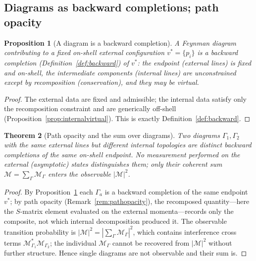\documentclass[11pt,a4paper]{article}
\theoremstyle{thmstyle}
\newtheorem{theorem}{Theorem}[section]
\newtheorem{proposition}[theorem]{Proposition}
\theoremstyle{definition}
\theoremstyle{remark}
\newcommand{\Mmat}{\mathcal{M}}
\begin{document}
\subsection{Diagrams as backward completions; path opacity}
\label{sec:diagramsbackward}

\begin{proposition}[A diagram is a backward completion]
\label{prop:diagrambackward}
A Feynman diagram contributing to a fixed on-shell external configuration
$v^{\ast}=\{p_i\}$ is a backward completion (Definition~\ref{def:backward})
of $v^{\ast}$: the endpoint (external lines) is fixed and on-shell, the
intermediate components (internal lines) are unconstrained except by
recomposition (conservation), and they may be virtual.
\end{proposition}

\begin{proof}
The external data are fixed and admissible; the internal data satisfy only
the recomposition constraint and are generically off-shell
(Proposition~\ref{prop:internalvirtual}). This is exactly
Definition~\ref{def:backward}.
\end{proof}

\begin{theorem}[Path opacity and the sum over diagrams]
\label{thm:qftopacity}
Two diagrams $\Gamma_1,\Gamma_2$ with the same external lines but different
internal topologies are distinct backward completions of the same
on-shell endpoint. No measurement performed on the external (asymptotic)
states distinguishes them; only their coherent sum
$\Mmat=\sum_{\Gamma}\Mmat_{\Gamma}$ enters the observable
$|\Mmat|^2$.
\end{theorem}

\begin{proof}
By Proposition~\ref{prop:diagrambackward} each $\Gamma_a$ is a backward
completion of the same endpoint $v^{\ast}$; by path opacity
(Remark~\ref{rem:pathopacity}), the recomposed quantity---here the
$S$-matrix element evaluated on the external momenta---records only the
composite, not which internal decomposition produced it. The observable
transition probability is $|\Mmat|^2=|\sum_\Gamma\Mmat_\Gamma|^2$, which
contains interference cross terms $\Mmat_{\Gamma_1}^{\ast}\Mmat_{\Gamma_2}$;
the individual $\Mmat_\Gamma$ cannot be recovered from $|\Mmat|^2$ without
further structure. Hence single diagrams are not observable and their sum
is.
\end{proof}
\end{document}
